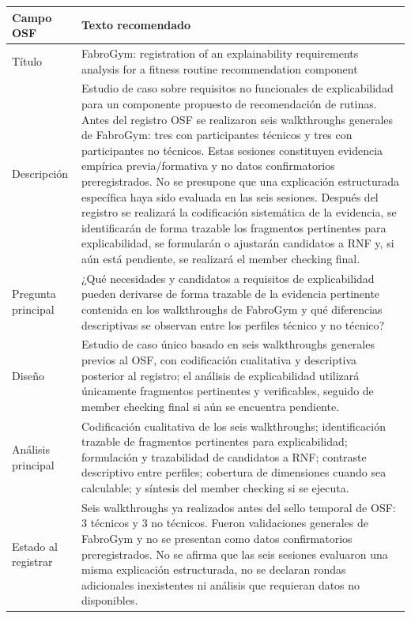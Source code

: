 \documentclass[9pt,a4paper]{extarticle}
\begin{document}
\begin{longtable}{@{}p{}p{}@{}}
\toprule
\textbf{Campo OSF} & \textbf{Texto recomendado} \\
\midrule
\endhead
Título & FabroGym: registration of an explainability requirements analysis for a fitness routine recommendation component \\
Descripción & Estudio de caso sobre requisitos no funcionales de explicabilidad para un componente propuesto de recomendación de rutinas. Antes del registro OSF se realizaron seis walkthroughs generales de FabroGym: tres con participantes técnicos y tres con participantes no técnicos. Estas sesiones constituyen evidencia empírica previa/formativa y no datos confirmatorios preregistrados. No se presupone que una explicación estructurada específica haya sido evaluada en las seis sesiones. Después del registro se realizará la codificación sistemática de la evidencia, se identificarán de forma trazable los fragmentos pertinentes para explicabilidad, se formularán o ajustarán candidatos a RNF y, si aún está pendiente, se realizará el member checking final. \\
Pregunta principal & ¿Qué necesidades y candidatos a requisitos de explicabilidad pueden derivarse de forma trazable de la evidencia pertinente contenida en los walkthroughs de FabroGym y qué diferencias descriptivas se observan entre los perfiles técnico y no técnico? \\
Diseño & Estudio de caso único basado en seis walkthroughs generales previos al OSF, con codificación cualitativa y descriptiva posterior al registro; el análisis de explicabilidad utilizará únicamente fragmentos pertinentes y verificables, seguido de member checking final si aún se encuentra pendiente. \\
Análisis principal & Codificación cualitativa de los seis walkthroughs; identificación trazable de fragmentos pertinentes para explicabilidad; formulación y trazabilidad de candidatos a RNF; contraste descriptivo entre perfiles; cobertura de dimensiones cuando sea calculable; y síntesis del member checking si se ejecuta. \\
Estado al registrar & Seis walkthroughs ya realizados antes del sello temporal de OSF: 3 técnicos y 3 no técnicos. Fueron validaciones generales de FabroGym y no se presentan como datos confirmatorios preregistrados. No se afirma que las seis sesiones evaluaron una misma explicación estructurada, no se declaran rondas adicionales inexistentes ni análisis que requieran datos no disponibles. \\
\bottomrule
\end{longtable}
\end{document}

